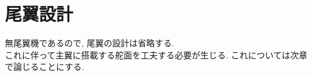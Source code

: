 \documentclass[class=article, crop=false, dvipdfmx, fleqn]{standalone}
\begin{document}
\section{尾翼設計}
無尾翼機であるので, 尾翼の設計は省略する. \\
これに伴って主翼に搭載する舵面を工夫する必要が生じる. これについては次章で論じることにする.
\end{document}

